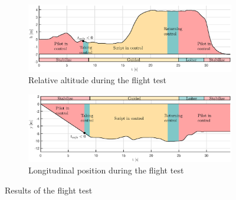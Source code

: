 
\begin{figure}[htbp]
	\centering
	\begin{subfigure}{\textwidth}
		\includegraphics[width=\textwidth]{./figures/h_flight.eps}
		\caption{Relative altitude during the flight test}
		\label{fig:h_flight}
	\end{subfigure}
	\begin{subfigure}{\textwidth}
		\includegraphics[width=\textwidth]{./figures/y_flight.eps}
		\caption{Longitudinal position during the flight test}
		\label{fig:y_flight}
	\end{subfigure}
	\caption{Results of the flight test}
	\label{fig:flight}
\end{figure}
